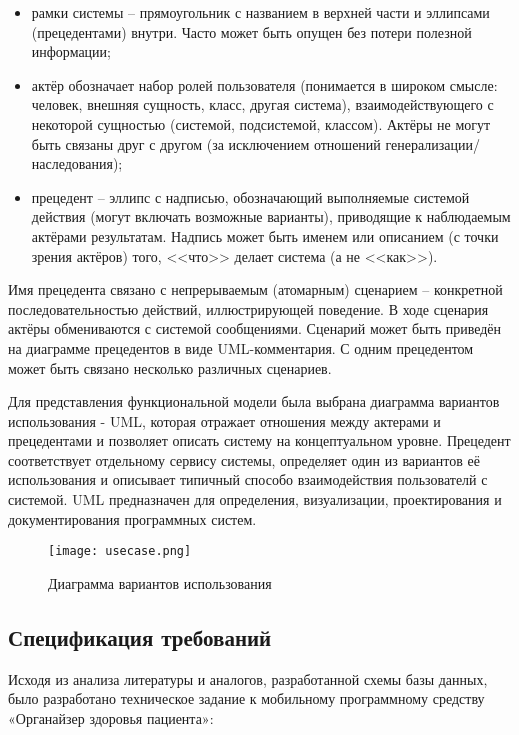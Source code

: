 \begin{itemize}
  \item рамки системы – прямоугольник с названием в верхней части и эллипсами (прецедентами) внутри. Часто может быть опущен без потери полезной информации;
  \item актёр обозначает набор ролей пользователя (понимается в широком смысле: человек, внешняя сущность, класс, другая система), взаимодействующего с некоторой сущностью (системой, подсистемой, классом). Актёры не могут быть связаны друг с другом (за исключением отношений генерализации/наследования);
  \item  прецедент – эллипс с надписью, обозначающий выполняемые системой действия (могут включать возможные варианты), приводящие к наблюдаемым актёрами результатам. Надпись может быть именем или описанием (с точки зрения актёров) того, <<что>> делает система (а не <<как>>).
\end{itemize}

Имя прецедента связано с непрерываемым (атомарным) сценарием – конкретной последовательностью действий, иллюстрирующей поведение. В ходе сценария актёры обмениваются с системой сообщениями. Сценарий  может быть приведён на диаграмме прецедентов в виде UML-комментария. С одним прецедентом может быть связано несколько различных сценариев.

Для представления функциональной модели была выбрана диаграмма вариантов использования - UML, которая отражает отношения между актерами и прецедентами и позволяет описать систему на концептуальном уровне. Прецедент соответствует отдельному сервису системы, определяет один из вариантов её использования и описывает типичный  способо взаимодействия пользователй с системой. UML предназначен для определения, визуализации, проектирования и документирования программных систем.

\begin{figure}[ht]
\centering
  \texttt{[image: usecase.png]}  
  \caption{ Диаграмма вариантов использования }
  \label{fig:domain:manual_structure:credit_usecase}
\end{figure}


\subsection{Спецификация требований }
\label{sub:practice:tab_task}

Исходя из анализа литературы и аналогов, разработанной схемы базы данных, было разработано техническое задание к мобильному программному средству «Органайзер здоровья пациента»: 


